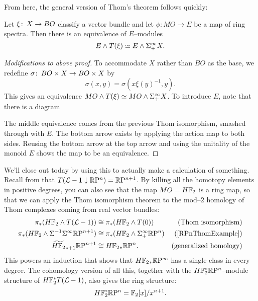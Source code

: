 \noindent From here, the general version of Thom's theorem follows quickly:

\begin{theorem}
Let $\xi\colon\thinspace X \to BO$ classify a vector bundle and let $\phi: MO \to E$ be a map of ring spectra. Then there is an equivalence of $E$--modules \[E \wedge T(\xi) \simeq E \wedge \Sigma^\infty_+ X.\]
\end{theorem}
\begin{proof}[Modifications to above proof]
To accommodate $X$ rather than $BO$ as the base, we redefine $\sigma\colon\thinspace BO \times X \to BO \times X$ by \[\sigma(x, y) = \sigma(x \xi(y)^{-1}, y).\]  This gives an equivalence $MO \wedge T(\xi) \simeq MO \wedge \Sigma^\infty_+ X$.  To introduce $E$, note that there is a diagram
\begin{center}
\end{center}
The middle equivalence comes from the previous Thom isomorphism, smashed through with $E$.  The bottom arrow exists by applying the action map to both sides.  Reusing the bottom arrow at the top arrow and using the unitality of the monoid $E$ shows the map to be an equivalence.
\end{proof}

\begin{example}
We'll close out today by using this to actually make a calculation of something. Recall from  that $T(\mathcal{L} - 1 \downarrow \mathbb R\mathrm P^n) = \mathbb R\mathrm P^{n+1}$.  By killing all the homotopy elements in positive degrees, you can also see that the map $MO = H\mathbb F_2$ is a ring map, so that we can apply the Thom isomorphism theorem to the mod--$2$ homology of Thom complexes coming from real vector bundles:
\begin{align*}
\pi_* (H\F_2 \sm T(\L - 1)) & \cong \pi_* (H\F_2 \sm T(0)) & \text{(Thom isomorphism)} \\
\pi_* (H\F_2 \sm \Susp^{-1} \Susp^\infty \RP^{n+1}) & \cong \pi_* (H\F_2 \sm \Susp^\infty_+ \RP^n) & \text{(\Cref{RPnThomExample})} \\
\widetilde{H\F_2}_{*+1} \RP^{n+1} & \cong H\F_2{}_* \RP^n. & \text{(generalized homology)}
\end{align*}
This powers an induction that shows that $H\mathbb F_2{}_* \mathbb R\mathrm P^\infty$ has a single class in every degree.    The cohomology version of all this, together with the $H\mathbb F_2^* \mathbb R\mathrm P^n$--module structure of $H\mathbb F_2^* T(\mathcal{L}-1)$, also gives the ring structure: \[H\mathbb F_2^* \mathbb R\mathrm P^n = \mathbb F_2[x] / x^{n+1}.\]
\end{example}






